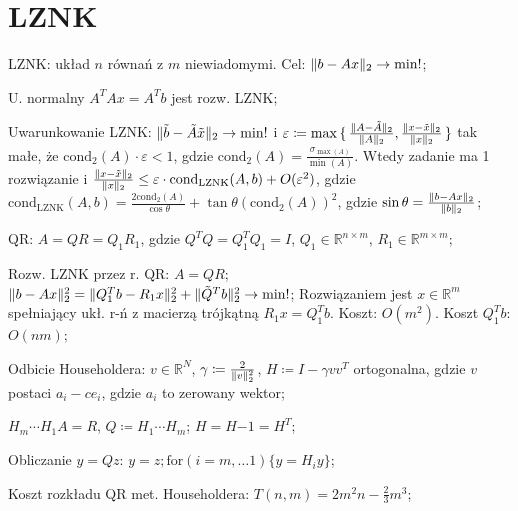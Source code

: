 \section{LZNK}

\entry
LZNK: układ $n$ równań z $m$ niewiadomymi.
Cel: $\|b - Ax\|_2 \to \min !$;

\entry
U. normalny
$A^TAx=A^Tb$
jest rozw. LZNK;

\entry
Uwarunkowanie LZNK:
$\|\tilde{b} - \tilde{A}\tilde{x}\|_2 \to \mathrm{min}!$
i $\varepsilon\coloneqq \max\set{ \frac{\|A - \tilde{A}\|_2}{\|A\|_2}, \frac{\|x - \tilde{x}\|_2}{\|x\|_2} }$
tak małe, że $\mathrm{cond}_2(A)\cdot \varepsilon < 1$,
gdzie $\mathrm{cond}_2(A) = \frac{\sigma_{\max(A)}}{\min(A)}$.
Wtedy zadanie ma 1 rozwiązanie i
$\frac{\|x-\tilde{x}\|_2}{\|x\|_2} \leq  \varepsilon \cdot \mathrm{cond}_{\mathrm{LZNK}}(A,b)+ O(\varepsilon^2)$,
gdzie $\mathrm{cond}_{\mathrm{LZNK}}(A,b) = \frac{2\mathrm{cond}_2(A)}{\cos\theta} + \tan\theta(\mathrm{cond}_2(A))^2$,
gdzie $\sin\theta=\frac{\|b-Ax\|_2}{\|b\|_2}$;

\entry
QR:
$A = QR = Q_1R_1$,
gdzie
$Q^TQ=Q^T_1Q_1=I$,
$Q_1\in\mathbb{R}^{n\times m}$,
$R_1\in\mathbb{R}^{m\times m}$;

\entry
Rozw. LZNK przez r. QR:
$A=QR$;
$\|b-Ax\|^2_2 = \|Q^T_1b-R_1x\|^2_2 + \|\tilde{Q}^Tb\|^2_2 \to \min !$;
Rozwiązaniem jest $x\in \mathbb{R}^m$ spełniający ukł. r-ń z macierzą trójkątną $R_1x=Q_1^Tb$.
Koszt: $O(m^2)$.
Koszt $Q_1^Tb$: $O(nm)$;


\entry
Odbicie Householdera:
$v\in \mathbb{R}^N$,
$\gamma \coloneqq \frac{2}{\|v\|^2_2} $,
$H\coloneqq I-\gamma vv^T$ ortogonalna, gdzie
$v$ postaci $a_i-ce_i$,
gdzie $a_i$ to zerowany wektor;

\entry
$H_m \cdots H_1 A = R$, $Q \coloneqq H_1 \cdots H_m$;
\entry
$H=H{-1}=H^T$;

\entry
Obliczanie $y=Qz$:
$y=z; \mathrm{for}(i=m,\ldots 1)\{y=H_iy\}$;

\entry
Koszt rozkładu QR met. Householdera: $T(n,m)=2m^2n - \frac{2}{3}m^3$;

